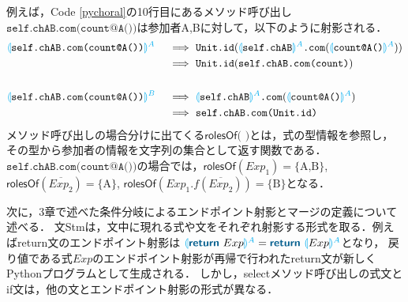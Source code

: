 \documentclass{thesis}
\newcommand{\projection}[2]{{\color{cyan}\llparenthesis}#1{\color{cyan}\rrparenthesis^#2}}
\newcommand{\mblue}[1]{\textbf{\textsf{\color{MidnightBlue}#1}}}
\begin{document}
例えば，Code \ref{pychoral}の10行目にあるメソッド呼び出し$\texttt{self.chAB.com(count@A())}$は参加者A,Bに対して，以下のように射影される．
\begin{alignat*}{2} 
  &\projection{\texttt{self.chAB.com(count@A())}}{A} &&~\Longrightarrow~ \texttt{Unit.id}(\projection{\texttt{self.chAB}}{A}\texttt{.com}(\projection{\texttt{count@A()}}{A})) \\
  &&&~\Longrightarrow~ \texttt{Unit.id}(\texttt{self.chAB.com(count)})\\
  \\
  &\projection{\texttt{self.chAB.com(count@A())}}{B} &&~\Longrightarrow~ \projection{\texttt{self.chAB}}{A}\texttt{.com}(\projection{\texttt{count@A()}}{A}) \\
  &&&~\Longrightarrow~ \texttt{self.chAB.com(Unit.id)}\\
\end{alignat*}
メソッド呼び出しの場合分けに出てくる$\textsf{rolesOf(~)}$とは，式の型情報を参照し，その型から参加者の情報を文字列の集合として返す関数である．
$\texttt{self.chAB.com(count@A())}$の場合では，$\textsf{rolesOf}(Exp_1) = \{\text{A,B}\}$, $\textsf{rolesOf}(\overline{Exp_2}) = \{\text{A}\}$, $\textsf{rolesOf}(Exp_1.f(\overline{Exp_2})) = \{\text{B}\}$となる．


次に，3章で述べた条件分岐によるエンドポイント射影とマージの定義について述べる．
文\textsf{Stm}は，文中に現れる式や文をそれぞれ射影する形式を取る．例えばreturn文のエンドポイント射影は
$\projection{\mblue{return} ~ Exp}{A} = \mblue{return} ~ \projection{Exp}{A}$となり，
戻り値である式$Exp$のエンドポイント射影が再帰で行われたreturn文が新しくPythonプログラムとして生成される．
しかし，\textsf{select}メソッド呼び出しの式文とif文は，他の文とエンドポイント射影の形式が異なる．
\end{document}
